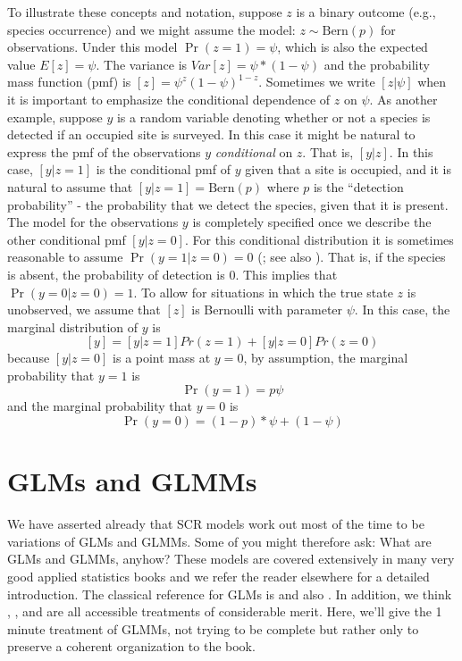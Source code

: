 To illustrate these concepts and notation, suppose $z$ is a binary
outcome (e.g., species occurrence) and we might assume the model: $z
\sim \mbox{Bern}(p)$ for observations.  Under this model $\Pr(z=1) =
\psi$, which is also the expected value $E[z] = \psi$. The variance is
$Var[z] = \psi*(1-\psi)$ and the probability mass function (pmf) is $[z]
= \psi^{z} (1-\psi)^{1-z}$. Sometimes we write $[z|\psi]$ when it is
important to emphasize the conditional dependence of $z$ on $\psi$. As
another example, suppose $y$ is a random variable denoting whether or
not a species is detected if an occupied site is surveyed. In this
case it might be natural to express the pmf of the observations $y$
{\it conditional} on $z$. That is, $[y|z]$. In this case, $[y|z=1]$ is
the conditional pmf of $y$ given that a site is occupied, and it is
natural to assume that $[y|z=1] = \mbox{Bern}(p)$ where $p$ is the
``detection probability'' - the probability that we detect the
species, given that it is present. The model for the observations $y$
is completely specified once we describe the other conditional pmf
$[y|z=0]$. For this conditional distribution it is sometimes
reasonable to assume $\Pr(y=1|z=0) = 0$ (\citet{mackenzie_etal:2002};
see also \citet{royle_link:2006}). That is, if the species is absent,
the probability of detection is 0. This implies that
$\Pr(y=0|z=0)=1$. To allow for situations in which the true state $z$
is unobserved, we  assume that $[z]$ is Bernoulli with parameter
$\psi$.  In this case, the marginal distribution of $y$ is
\[
 [y] = [y|z=1]Pr(z=1) + [y|z=0]Pr(z=0)
\]
because $[y|z=0]$ is a point mass at $y=0$, by assumption, the marginal
probability that $y=1$ is
\[
\Pr(y=1) = p \psi
\]
and the marginal probability that $y=0$ is
\[
\Pr(y=0) = (1-p)*\psi + (1-\psi)
\]

\section{
GLMs and GLMMs}
We have asserted already that SCR models work out most of the time to
be variations of GLMs and GLMMs. Some of you might therefore ask: What
are GLMs and GLMMs, anyhow?   These models are covered extensively in
many very good applied statistics books and we refer the reader
elsewhere for a detailed introduction.  The
classical reference for GLMs is \citet{nelder_wedderburn:1972} and
also \citet{mccullagh_nelder:1989}. In addition, we think \citet{kery:2010},
\citet{kery_schaub:2011}, and \citet{zuur_etal:2009} are all
accessible treatments of considerable merit. 
Here, we'll give the 1
minute
treatment of GLMMs, not trying to be complete but rather only
to preserve a coherent organization to the book.


